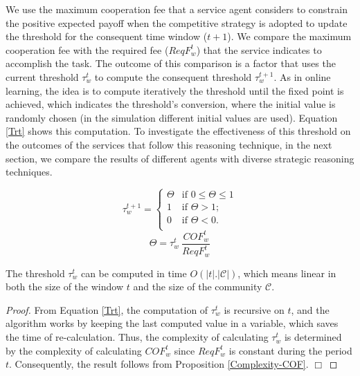 We use the maximum cooperation fee that a service agent considers
to constrain the positive expected payoff when the competitive
strategy is adopted to update the threshold for the consequent
time window ($t+1$). We compare the maximum cooperation fee with
the required fee ($ReqF_w^t$) that the service indicates to
accomplish the task. The outcome of this comparison is a factor
that uses the current threshold $\tau_w^t$ to compute the
consequent threshold $\tau_w^{t+1}$. As in online learning, the
idea is to compute iteratively the threshold until the fixed point
is achieved, which indicates the threshold's conversion, where the
initial value is randomly chosen (in the simulation different
initial values are used). Equation
\ref{Trt} shows this computation. %
To investigate the effectiveness of this threshold on the outcomes
of the services that follow this reasoning technique, in the next
section, we compare the results of different agents with diverse
strategic reasoning techniques.

\begin{equation}\label{Trt}
\tau_w^{t+1}=\begin{cases}
\Theta & \text{if $0 \leq \Theta \leq 1$}\\
1 & \text{if $\Theta > 1$;}\\
0 & \text{if $\Theta < 0$.}\\
\end{cases}
\end{equation}
\begin{equation*}
\Theta =\tau_w^t \ \frac{COF_w^t}{ReqF_w^t}
\end{equation*}


\begin{proposition}\label{Complexity-Threshold}
The threshold $\tau_w^{t}$ can be computed in time
$O(|t|.|\mathcal{C}|)$, which means linear in both the size of the
window $t$ and the size of the community $\mathcal{C}$.
\end{proposition}

\begin{proof}
From Equation \ref{Trt}, the computation of $\tau_w^{t}$ is
recursive on $t$, and the algorithm works by keeping the last
computed value in a variable, which saves the time of
re-calculation. Thus, the complexity of calculating $\tau_w^{t}$
is determined by the complexity of calculating $COF_w^t$ since
$ReqF_w^t$ is constant during the period $t$. Consequently, the
result follows from Proposition \ref{Complexity-COF}. $\Box$
\end{proof}


